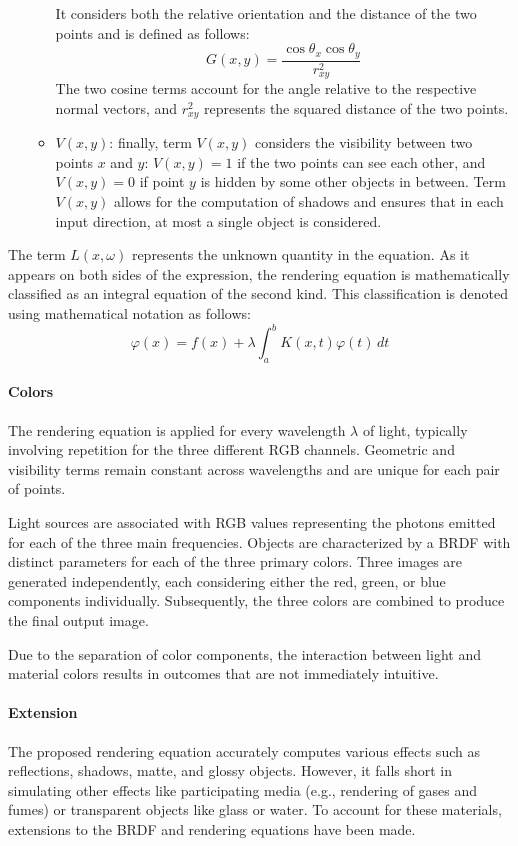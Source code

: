 \begin{itemize}
\begin{itemize}
                It considers both the relative orientation and the distance of the two points and is defined as follows:
                \[G(x,y)=\dfrac{\cos\theta_x\cos\theta_y}{r_{xy}^2}\]
                The two cosine terms account for the angle relative to the respective normal vectors, and $r_{xy}^2$ represents the squared distance of the two points.
            \item $V(x,y)$: finally, term $V(x,y)$ considers the visibility between two points $x$ and $y$: $V(x,y) = 1$ if the two points can see each other, and $V(x,y) = 0$ if point $y$ is hidden by some other objects in between. 
                Term $V(x,y)$ allows for the computation of shadows and ensures that in each input direction, at most a single object is considered.
        \end{itemize}
\end{itemize}
The term $L(x, \omega)$ represents the unknown quantity in the equation. 
As it appears on both sides of the expression, the rendering equation is mathematically classified as an integral equation of the second kind. 
This classification is denoted using mathematical notation as follows:
\[\varphi(x)=f(x)+\lambda\int_a^b K(x,t)\varphi(t)\, dt\]

\paragraph*{Colors}
The rendering equation is applied for every wavelength $\lambda$ of light, typically involving repetition for the three different RGB channels. 
Geometric and visibility terms remain constant across wavelengths and are unique for each pair of points.

Light sources are associated with RGB values representing the photons emitted for each of the three main frequencies. 
Objects are characterized by a BRDF with distinct parameters for each of the three primary colors. 
Three images are generated independently, each considering either the red, green, or blue components individually. 
Subsequently, the three colors are combined to produce the final output image.

Due to the separation of color components, the interaction between light and material colors results in outcomes that are not immediately intuitive.

\paragraph*{Extension}
The proposed rendering equation accurately computes various effects such as reflections, shadows, matte, and glossy objects. 
However, it falls short in simulating other effects like participating media (e.g., rendering of gases and fumes) or transparent objects like glass or water. 
To account for these materials, extensions to the BRDF and rendering equations have been made.

